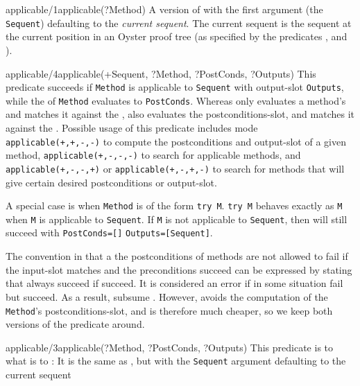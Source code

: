 \begin{predicate}{applicable/1}{applicable(?Method)}%
A version of  with the first argument (the {\tt
Sequent}) defaulting to the {\em current sequent}.  The current
sequent is the sequent at the current position in an Oyster
proof tree (as specified by the predicates ,
 and ). 
\end{predicate}

\begin{predicate}{applicable/4}{applicable(+Sequent, ?Method, ?PostConds, ?Outputs)}
This predicate succeeds if {\tt Method} is applicable to {\tt Sequent} with
output-slot {\tt Outputs}, while the  of
{\tt Method} evaluates to {\tt PostConds}. Whereas
 only evaluates a method's
 and matches it against the ,
 also evaluates the postconditions-slot, and matches
it against the . Possible usage of this predicate
includes mode {\tt applicable(+,+,-,-)} to compute the postconditions and
output-slot of a given method, {\tt applicable(+,-,-,-)} to search for
applicable methods, and {\tt applicable(+,-,-,+)} or
{\tt applicable(+,-,+,-)} to search for methods that will give
certain desired postconditions or output-slot.

A special case is when {\tt Method} is of the form {\tt try M}.
{\tt try M} behaves exactly as {\tt M} when {\tt M} is applicable to
{\tt Sequent}. If {\tt M} is not applicable to {\tt Sequent}, then 
 will still succeed with {\tt PostConds=[]}
{\tt Outputs=[Sequent]}.
\end{predicate}

The convention in that a the postconditions of methods are not
allowed to fail if the input-slot matches and the preconditions
succeed can be expressed by stating that  always
succeed if  succeed. It is considered an error if
in some situation  fail but 
succeed. As a result, 
subsume . However, 
avoids the computation of the {\tt Method}'s postconditions-slot, and
is therefore much cheaper, so we keep both versions of the predicate
around. 

\begin{predicate}{applicable/3}{applicable(?Method, ?PostConds, ?Outputs)}%
This predicate is to  what  is to
: It is the same as , but with the
{\tt Sequent} argument defaulting to the current sequent
\end{predicate}

